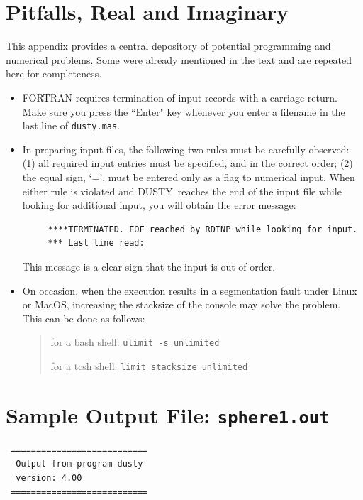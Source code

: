 \documentclass[11pt]{article}
\def\D    {{\sf DUSTY}}
\begin{document}
\begin{appendix}
\section{Pitfalls, Real and Imaginary} \label{pitfalls}

This appendix provides a central depository of potential programming
and numerical problems. Some were already mentioned in the text and
are repeated here for completeness.

\begin{itemize}
\item FORTRAN requires termination of input records with a carriage
  return.  Make sure you press the ``Enter" key whenever you enter a
  filename in the last line of {\tt dusty.mas}.

\item In preparing input files, the following two rules must be
  carefully observed: (1) all required input entries must be
  specified, and in the correct order; (2) the equal sign, `=', must
  be entered only as a flag to numerical input. When either rule is
  violated and \D\ reaches the end of the input file while looking for
  additional input, you will obtain the error message:
\begin{verbatim}
     ****TERMINATED. EOF reached by RDINP while looking for input.
     *** Last line read:
\end{verbatim}
  This message is a clear sign that the input is out of order.


\item On occasion, when the execution results in a segmentation fault
  under Linux or MacOS, increasing the stacksize of the console may
  solve the problem. This can be done as follows:
  \begin{quote}
    for a bash shell: {\tt ulimit -s unlimited}

    for a tcsh shell: {\tt limit stacksize unlimited}
  \end{quote}

\end{itemize}


\newpage

\section{Sample Output File: {\tt sphere1.out}}
\label{sphere1}

\begin{verbatim}
 ===========================
  Output from program dusty
  version: 4.00
 ===========================


\end{verbatim}
\end{appendix}
\end{document}
